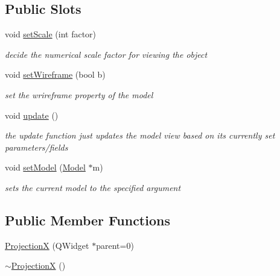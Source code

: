\subsection*{Public Slots}
\begin{DoxyCompactItemize}
\item 
void \mbox{\hyperlink{class_projection_x_a863c01fcbb77cb13856feb3605fc6390}{set\+Scale}} (int factor)
\begin{DoxyCompactList}\small\item\em decide the numerical scale factor for viewing the object \end{DoxyCompactList}\item 
void \mbox{\hyperlink{class_projection_x_a16849f2ef9fe0332c0ad9f833dc85651}{set\+Wireframe}} (bool b)
\begin{DoxyCompactList}\small\item\em set the wrireframe property of the model \end{DoxyCompactList}\item 
void \mbox{\hyperlink{class_projection_x_a7efa3839fdf999686464fe60ea59a349}{update}} ()
\begin{DoxyCompactList}\small\item\em the update function just updates the model view based on its currently set parameters/fields \end{DoxyCompactList}\item 
void \mbox{\hyperlink{class_projection_x_aab00d67a74912bdff9f963664b708c14}{set\+Model}} (\mbox{\hyperlink{class_model}{Model}} $\ast$m)
\begin{DoxyCompactList}\small\item\em sets the current model to the specified argument \end{DoxyCompactList}\end{DoxyCompactItemize}
\subsection*{Public Member Functions}
\begin{DoxyCompactItemize}
\item 
\mbox{\hyperlink{class_projection_x_a251536fb76aabbf276ce0cd2341d1dc3}{ProjectionX}} (Q\+Widget $\ast$parent=0)
\item 
\mbox{\hyperlink{class_projection_x_a903b7fc4e98525180ec9a3bed152a70a}{$\sim$\+ProjectionX}} ()
\end{DoxyCompactItemize}
